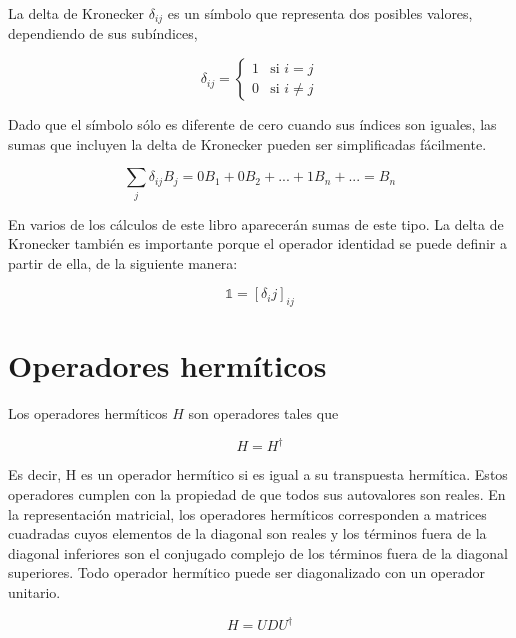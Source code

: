 La delta de Kronecker $\delta_{ij}$ es un símbolo que representa dos posibles valores, dependiendo de sus subíndices,

\begin{equation}
    \delta_{ij} =
    \begin{cases}
        1 & \text{si } i = j \\
        0 & \text{si } i \neq j
    \end{cases}
\end{equation}

Dado que el símbolo sólo es diferente de cero cuando sus índices son iguales, las sumas que incluyen la delta de Kronecker pueden ser simplificadas fácilmente.

\begin{equation*}
    \sum\limits_j \delta_{ij} B_j = 0 B_1 + 0 B_2 + ... + 1 B_n + ... = B_n
\end{equation*}

En varios de los cálculos de este libro aparecerán sumas de este tipo. La delta de Kronecker también es importante porque el operador identidad se puede definir a partir de ella, de la siguiente manera:

\begin{equation}
    \mathds{1} = [\delta_ij]_{ij}
\end{equation}

\section{Operadores hermíticos}

Los operadores hermíticos $H$ son operadores tales que

\begin{equation}
    H = H^\dagger
\end{equation}

Es decir, H es un operador hermítico si es igual a su transpuesta hermítica. Estos operadores cumplen con la propiedad de que todos sus autovalores son reales. En la representación matricial, los operadores hermíticos corresponden a matrices cuadradas cuyos elementos de la diagonal son reales y los términos fuera de la diagonal inferiores son el conjugado complejo de los términos fuera de la diagonal superiores. Todo operador hermítico puede ser diagonalizado con un operador unitario.

\begin{equation}
    H = U D U^\dagger
\end{equation}

